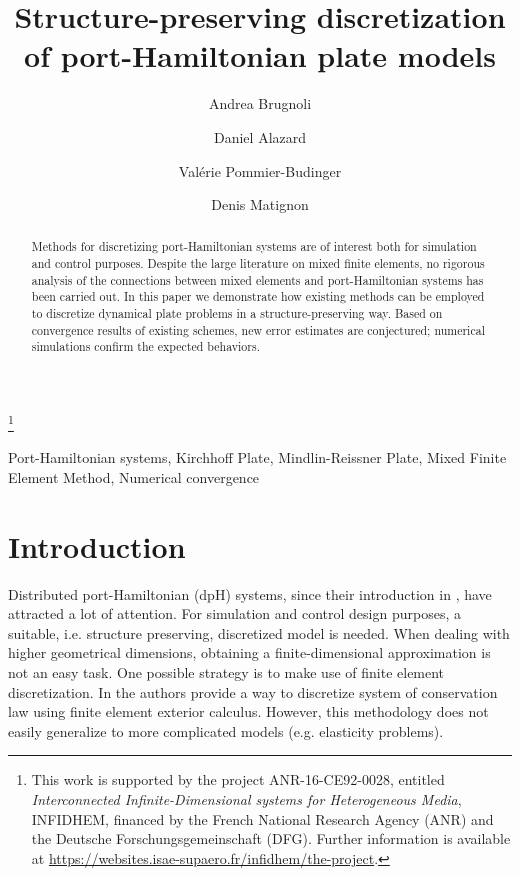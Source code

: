 \documentclass{ifacconf}
\begin{document}
\begin{frontmatter}

\title{Structure-preserving discretization of port-Hamiltonian plate models } 

\thanks[footnoteinfo]{This work is  supported by the project ANR-16-CE92-0028,
	entitled {\em Interconnected Infinite-Dimensional systems for Heterogeneous
		Media}, INFIDHEM, financed by the French National
	Research Agency (ANR) and the Deutsche Forschungsgemeinschaft (DFG). Further information is available at {\url{https://websites.isae-supaero.fr/infidhem/the-project}}.
	}

\author[ISAE]{Andrea Brugnoli}
\author[ISAE]{Daniel Alazard} 
\author[ISAE]{Val\'erie Pommier-Budinger}
\author[ISAE]{Denis Matignon}

\address[ISAE]{ISAE-SUPAERO, Universit\'e de Toulouse, France.\\
	10 Avenue Edouard Belin, BP-54032, 31055 Toulouse Cedex 4. \\
	Andrea.Brugnoli@isae.fr,  Daniel.Alazard@isae.fr, \\
	Valerie.Budinger@isae.fr, Denis.Matignon@isae.fr}

\begin{abstract}
Methods for discretizing port-Hamiltonian systems are of interest both for simulation and control purposes. Despite the large literature on mixed finite elements, no rigorous analysis of the connections between mixed elements and port-Hamiltonian systems has been carried out. In this paper we demonstrate how existing methods can be employed to discretize dynamical plate problems in a structure-preserving way. Based on convergence results of existing schemes, new error estimates are conjectured; numerical simulations confirm the expected behaviors.
\end{abstract}

\begin{keyword}
Port-Hamiltonian systems, Kirchhoff Plate, Mindlin-Reissner Plate, Mixed Finite Element Method, Numerical convergence
\end{keyword}

\end{frontmatter}

\section{Introduction}
Distributed port-Hamiltonian (dpH) systems, since their introduction in \cite{VANDERSCHAFTdph}, have attracted a lot of attention. For simulation and control design purposes, a suitable, i.e. structure preserving, discretized model is needed. When dealing with higher geometrical dimensions, obtaining a finite-dimensional approximation is not an easy task. One possible strategy is to make use of finite element discretization. In \cite{WeakForm_Kot} the authors provide a way to discretize system of conservation law using finite element exterior calculus. However, this methodology does not easily generalize to more complicated models (e.g. elasticity problems).
\end{document}
